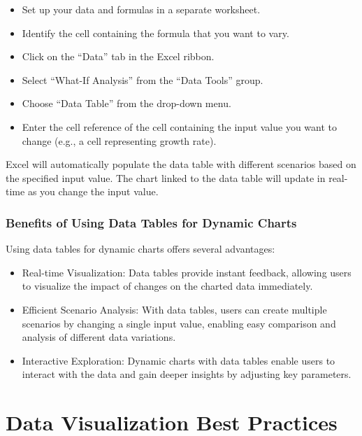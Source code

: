 \documentclass[
]{book}
\providecommand{\tightlist}{%
  \setlength{\itemsep}{0pt}\setlength{\parskip}{0pt}}
\begin{document}
\begin{itemize}
\tightlist
\item
  Set up your data and formulas in a separate worksheet.
\item
  Identify the cell containing the formula that you want to vary.
\item
  Click on the ``Data'' tab in the Excel ribbon.
\item
  Select ``What-If Analysis'' from the ``Data Tools'' group.
\item
  Choose ``Data Table'' from the drop-down menu.
\item
  Enter the cell reference of the cell containing the input value you want to change (e.g., a cell representing growth rate).
\end{itemize}

Excel will automatically populate the data table with different scenarios based on the specified input value.
The chart linked to the data table will update in real-time as you change the input value.

\hypertarget{benefits-of-using-data-tables-for-dynamic-charts}{%
\subsection{Benefits of Using Data Tables for Dynamic Charts}\label{benefits-of-using-data-tables-for-dynamic-charts}}

Using data tables for dynamic charts offers several advantages:

\begin{itemize}
\tightlist
\item
  Real-time Visualization: Data tables provide instant feedback, allowing users to visualize the impact of changes on the charted data immediately.
\item
  Efficient Scenario Analysis: With data tables, users can create multiple scenarios by changing a single input value, enabling easy comparison and analysis of different data variations.
\item
  Interactive Exploration: Dynamic charts with data tables enable users to interact with the data and gain deeper insights by adjusting key parameters.
\end{itemize}

\hypertarget{data-visualization-best-practices}{%
\chapter{Data Visualization Best Practices}\label{data-visualization-best-practices}}
\end{document}
